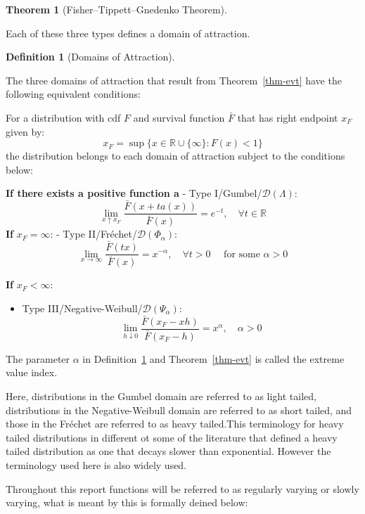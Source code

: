 \documentclass[
  10pt,
  a4paper,
]{scrreprt}
\providecommand{\tightlist}{%
  \setlength{\itemsep}{0pt}\setlength{\parskip}{0pt}}\usepackage{longtable,booktabs,array}
\theoremstyle{plain}
\newtheorem{theorem}{Theorem}[section]
\theoremstyle{definition}
\newtheorem{definition}{Definition}[section]
\theoremstyle{remark}
\begin{document}
{\begin{theorem}[Fisher--Tippett--Gnedenko
Theorem]
\end{theorem}

Each of these three types defines a domain of attraction.

\begin{definition}[Domains of
Attraction]\protect\hypertarget{def-doa}{}\label{def-doa}

The three domains of attraction that result from Theorem~\ref{thm-evt}
have the following equivalent conditions:

For a distribution with cdf \(F\) and survival function \(\bar F\) that
has right endpoint \(x_F\) given by: \[
x_F = \sup\{x \in \mathbb R \cup\{\infty\}:F(x)<1\}
\] the distribution belongs to each domain of attraction subject to the
conditions below:

\textbf{If there exists a positive function a} - Type
I/Gumbel/\(\mathcal D(\Lambda)\): \[
\lim_{x\uparrow x_F} \displaystyle\frac{\bar F(x+ta(x))}{\bar F(x)} = e^{-t},\quad \forall t\in\mathbb R
\] \textbf{If} \(x_F=\infty\): - Type
II/Fréchet/\(\mathcal D (\Phi_\alpha)\): \[
\lim_{x\rightarrow\infty} \displaystyle\frac{\bar F(tx)}{\bar F(x)} = x^{-\alpha}, \quad \forall t>0 \quad \text{ for some } \alpha>0
\]

\textbf{If} \(x_F<\infty\):

\begin{itemize}
\tightlist
\item
  Type III/Negative-Weibull/\(\mathcal D(\Psi_\alpha)\): \[
  \lim_{h\downarrow 0}\displaystyle\frac{\bar F(x_F-xh)}{\bar F(x_F-h)} = x^\alpha, \quad\alpha>0
  \]
\end{itemize}

\end{definition}

The parameter \(\alpha\) in Definition~\ref{def-doa} and
Theorem~\ref{thm-evt} is called the extreme value index.

Here, distributions in the Gumbel domain are referred to as light
tailed, distributions in the Negative-Weibull domain are referred to as
short tailed, and those in the Fréchet are referred to as heavy
tailed.This terminology for heavy tailed distributions in different ot
some of the literature that defined a heavy tailed distribution as one
that decays slower than exponential. However the terminology used here
is also widely used.

Throughout this report functions will be referred to as regularly
varying or slowly varying, what is meant by this is formally deined
below:

}
\end{document}
